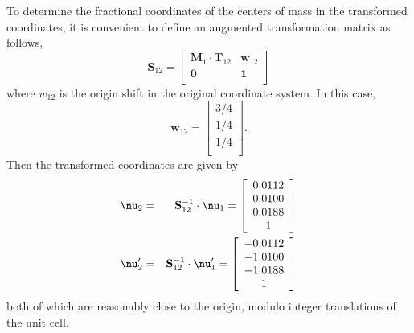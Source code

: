 \documentclass{iucr}              %
\begin{document}
To determine the fractional coordinates of the centers of mass in the transformed coordinates, it is convenient to define an augmented transformation matrix as follows,
\begin{equation}
   \mathbf{S}_{12}=\left[
     \begin{array}{cc}
        \mathbf{M}_{1}\cdot\mathbf{T}_{12}& \mathbf{w}_{12}\\
        \mathbf{0}& \mathbf{1}\\
     \end{array}
  \right]
\end{equation}
where $w_{12}$ is the origin shift in the original coordinate system.  In this case,
\begin{equation}
   \mathbf{w}_{12}=\left[
     \begin{array}{c}
        3/4\\
        1/4\\
        1/4\\
     \end{array}
  \right].
\end{equation}
Then the transformed coordinates are given by 
\begin{eqnarray}
   \mbox{\boldmath$\nu$}_{2}&=&\mathbf{S}_{12}^{-1}\cdot
\mbox{\boldmath$\nu$}_{1}=\left[
     \begin{array}{c}
        0.0112\\
        0.0100\\
        0.0188\\
	1\\
     \end{array}
  \right]\\
   \mbox{\boldmath$\nu$}_{2}^\prime&=&\mathbf{S}_{12}^{-1}\cdot
\mbox{\boldmath$\nu$}_{1}^\prime=\left[
     \begin{array}{c}
        -0.0112\\
        -1.0100\\
       -1.0188\\
	1\\
     \end{array}
  \right]
\end{eqnarray}
both of which are reasonably close to the origin, modulo integer translations of the unit cell.
\end{document}

